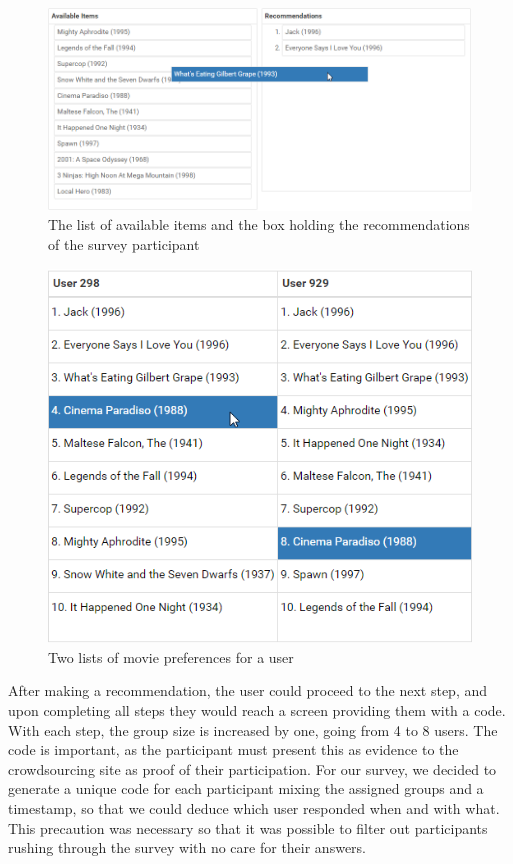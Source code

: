 \begin{figure}\label{fig:appendix_recbox}
	\includegraphics[scale=0.35]{graphics/recbox.png}
	\caption{The list of available items and the box holding the recommendations of the survey participant}
\end{figure}

\begin{figure}\label{fig:appendix_userprefs}
	\includegraphics[scale=0.5]{graphics/users.png}
	\caption{Two lists of movie preferences for a user}
\end{figure}

After making a recommendation, the user could proceed to the next step, and upon completing all steps they would reach a screen providing them with a code. With each step, the group size is increased by one, going from 4 to 8 users. The code is important, as the participant must present this as evidence to the crowdsourcing site as proof of their participation. For our survey, we decided to generate a unique code for each participant mixing the assigned groups and a timestamp, so that we could deduce which user responded when and with what. This precaution was necessary so that it was possible to filter out participants rushing through the survey with no care for their answers.

